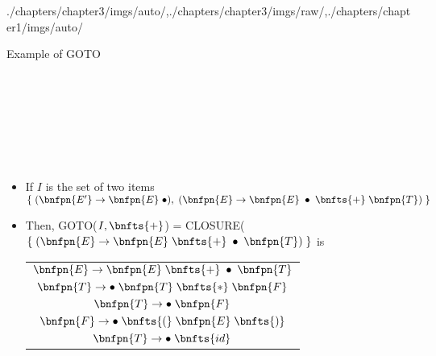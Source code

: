 \begin{graphicspathcontext}{{./chapters/chapter3/imgs/auto/},{./chapters/chapter3/imgs/raw/},{./chapters/chapter1/imgs/auto/}}
\begin{bibunit}[apalike]
\begin{frame}{Example of GOTO}
	\begin{center}\scriptsize
		\begin{minipage}{.4\linewidth}\begin{bnf}
			 \\
			 \\
			 \\
			 \\
			 \\
			 \\
		\end{bnf}\end{minipage}
	\end{center}
	\begin{itemize}
	\item If $I$ is the set of two items $\left\{ \; (\bnfpn{E'} \bnfopo \bnfpn{E} \; \bnfindex), \; (\bnfpn{E} \bnfopo \bnfpn{E} \; \bnfindex \; \bnfts{+} \; \bnfpn{T}) \; \right\}$
	\item Then, GOTO($I,\bnfts{+}$) = CLOSURE( $\{ \; (\bnfpn{E} \bnfopo \bnfpn{E} \; \bnfts{+} \; \bnfindex \; \bnfpn{T}) \; \}$ is \\
		\begin{center}\begin{scriptsize}
		\begin{tabular}[t]{|c|}
			\hline
			$\bnfpn{E} \bnfopo \bnfpn{E} \; \bnfts{+} \; \bnfindex \; \bnfpn{T}$ \\
			$\bnfpn{T} \bnfopo \bnfindex \; \bnfpn{T} \; \bnfts{*} \; \bnfpn{F}$ \\
			$\bnfpn{T} \bnfopo \bnfindex \; \bnfpn{F}$ \\
			$\bnfpn{F} \bnfopo \bnfindex \; \bnfts{(} \; \bnfpn{E} \; \bnfts{)}$ \\
			$\bnfpn{T} \bnfopo \bnfindex \; \bnfts{id}$ \\
			\hline
		\end{tabular}
		\end{scriptsize}\end{center}
	\end{itemize}
\end{frame}


\end{bibunit}
\end{graphicspathcontext}
